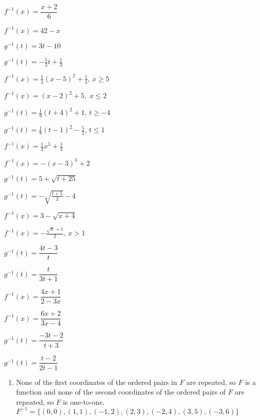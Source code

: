 \begin{exenum}
\addtocounter{enumi}{8}

\item $f^{-1}(x) = \dfrac{x + 2}{6}$
\item $f^{-1}(x) = 42-x$
\item  $g^{-1}(t) = 3t-10$
\item $g^{-1}(t)  = -\frac{5}{3} t + \frac{1}{3}$
\item $f^{-1}(x) = \frac{1}{3}(x-5)^2+\frac{1}{3}$, $x \geq 5$
\item $f^{-1}(x) = (x - 2)^{2} + 5, \; x \leq 2$
\item $g^{-1}(t) = \frac{1}{9}(t+4)^2+1$, $t \geq -4$
\item $g^{-1}(t) = \frac{1}{8}(t-1)^2-\frac{5}{2}$, $t \leq 1$
\item $f^{-1}(x) = \frac{1}{3} x^{5} + \frac{1}{3}$
\item $f^{-1}(x) = -(x-3)^3+2$
\item $g^{-1}(t) = 5 + \sqrt{t+25}$
\item $g^{-1}(t) = -\sqrt{\frac{t + 5}{3}} - 4$
\item $f^{-1}(x) = 3 - \sqrt{x+4}$
\item $f^{-1}(x) =-\frac{\sqrt{x}+1}{2}$, $x > 1$
\item $g^{-1}(t) = \dfrac{4t-3}{t}$
\item $g^{-1}(t) = \dfrac{t}{3t+1}$
\item $f^{-1}(x) = \dfrac{4x+1}{2-3x}$
\item $f^{-1}(x) = \dfrac{6x + 2}{3x - 4}$
\item $g^{-1}(t) = \dfrac{-3t - 2}{t + 3}$
\item $g^{-1}(t) = \dfrac{t-2}{2t-1}$ 

\item

\begin{enumerate}

\item  None of the first coordinates of the ordered pairs in $F$ are repeated, so $F$ is a function and none of the second coordinates of the ordered pairs of $F$ are repeated, so $F$ is one-to-one.   $F^{-1} = \{ (0,0), (1,1), (-1,2), (2,3), (-2,4), \allowbreak (3,5), (-3,6)  \}$


\end{enumerate}
\end{exenum}
